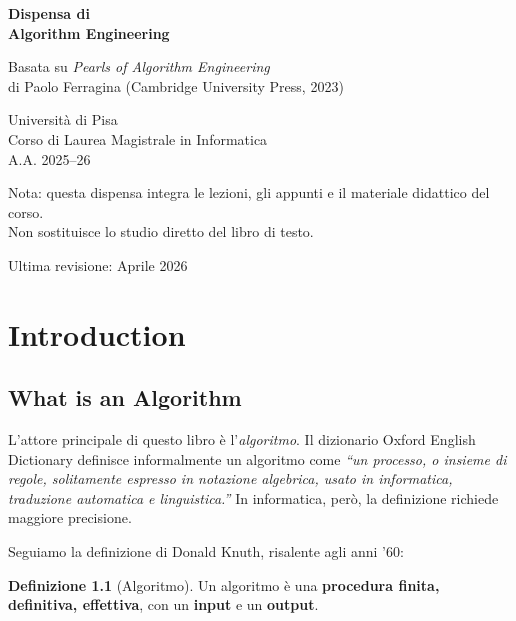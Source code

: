 \documentclass[12pt, a4paper, oneside]{book}
\theoremstyle{plain}
\theoremstyle{definition}
\newtheorem{definizione}[teorema]{Definizione}
\theoremstyle{remark}
\begin{document}
\frontmatter

\begin{titlepage}
\centering
\vspace*{3cm}
{\Huge\bfseries Dispensa di\\[0.4em] Algorithm Engineering\par}
\vspace{1.5cm}
{\large Basata su \textit{Pearls of Algorithm Engineering}\\di Paolo Ferragina (Cambridge University Press, 2023)\par}
\vspace{2cm}
{\large Università di Pisa\\Corso di Laurea Magistrale in Informatica\\A.A. 2025--26\par}
\vspace{3cm}
{\small Nota: questa dispensa integra le lezioni, gli appunti e il materiale didattico del corso.\\
Non sostituisce lo studio diretto del libro di testo.\par}
\vfill
{\small Ultima revisione: Aprile 2026}
\end{titlepage}

\tableofcontents

\mainmatter

\chapter{Introduction}

\section{What is an Algorithm}

L'attore principale di questo libro è l'\emph{algoritmo}. Il dizionario Oxford English Dictionary definisce informalmente un algoritmo come \textit{``un processo, o insieme di regole, solitamente espresso in notazione algebrica, usato in informatica, traduzione automatica e linguistica.''} In informatica, però, la definizione richiede maggiore precisione.

Seguiamo la definizione di Donald Knuth, risalente agli anni '60:

\begin{definizione}[Algoritmo]
Un algoritmo è una \textbf{procedura finita, definitiva, effettiva}, con un \textbf{input} e un \textbf{output}.
\end{definizione}
\end{document}
